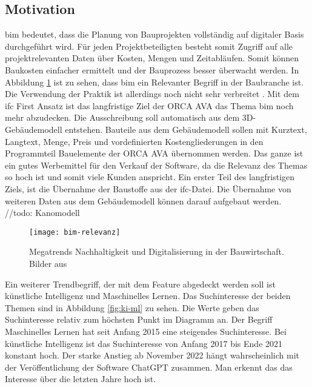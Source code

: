 \subsection{Motivation}
\label{c:intro:motivation}


\ac{bim} bedeutet, dass die Planung von Bauprojekten vollständig auf digitaler Basis durchgeführt wird.  Für jeden Projektbeteiligten besteht somit Zugriff auf alle projektrelevanten Daten über Kosten, Mengen und Zeitabläufen. Somit können Baukosten einfacher ermittelt und der Bauprozess besser überwacht werden. In Abbildung \ref{fig:bim} ist zu sehen, dass \ac{bim} ein Relevanter Begriff in der Baubranche ist. Die Verwendung der Praktik ist allerdings noch nicht sehr verbreitet \citep[p.~20]{Thomas_Baumanns_Dr_Philipp-Stephan_Freber_Dr_Kai-Stefan_Schober_Dr_Florian_Kirchner2016-gu}. Mit dem \glqq \ac{ifc} First\grqq{} Ansatz ist das langfristige Ziel der ORCA AVA das Thema \ac{bim} noch mehr abzudecken. Die Ausschreibung soll automatisch aus dem 3D-Gebäudemodell entstehen. Bauteile aus dem Gebäudemodell sollen mit Kurztext, Langtext, Menge, Preis und vordefinierten Kostengliederungen in den Programmteil Bauelemente der ORCA AVA übernommen werden. Das ganze ist ein gutes Werbemittel für den Verkauf der Software, da die Relevanz des Themas so hoch ist und somit viele Kunden anspricht. Ein erster Teil des langfristigen Ziels, ist die Übernahme der Baustoffe aus der \ac{ifc}-Datei. Die Übernahme von weiteren Daten aus dem Gebäudemodell können darauf aufgebaut werden.
//todo: Kanomodell
\begin{figure}[h]
	\centering
	\texttt{[image: bim-relevanz]}
	\caption[Relevanz \ac{bim}]
	{Megatrends Nachhaltigkeit und Digitalisierung in der Bauwirtschaft. Bilder aus \citep[p.~20]{Thomas_Baumanns_Dr_Philipp-Stephan_Freber_Dr_Kai-Stefan_Schober_Dr_Florian_Kirchner2016-gu}}
	\label{fig:bim}
\end{figure}


Ein weiterer Trendbegriff, der mit dem Feature abgedeckt werden soll ist \glqq künstliche Intelligenz\grqq{} und \glqq Maschinelles Lernen\grqq{}. Das Suchinteresse der beiden Themen sind in Abbildung \ref{fig:ki-ml} zu sehen. Die Werte geben das Suchinteresse relativ zum höchsten Punkt im Diagramm an. Der Begriff \glqq Maschinelles Lernen\grqq{} hat seit Anfang 2015 eine steigendes Suchinteresse. Bei \glqq künstliche Intelligenz\grqq{} ist das Suchinteresse von Anfang 2017 bis Ende 2021 konstant hoch. Der starke Anstieg ab November 2022 hängt wahrscheinlich mit der Veröffentlichung der Software ChatGPT zusammen. Man erkennt das das Interesse über die letzten Jahre hoch ist.

